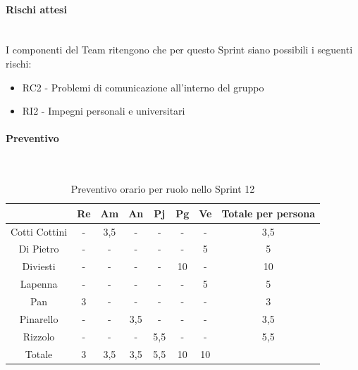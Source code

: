 \documentclass{article}
\begin{document}
                \paragraph{Rischi attesi}\mbox{}\\
                I componenti del Team ritengono che per questo Sprint siano possibili i seguenti rischi:
                \begin{itemize}
                    \item RC2 - Problemi di comunicazione all’interno del gruppo
                    \item RI2 - Impegni personali e universitari
                \end{itemize}

                \paragraph{Preventivo}\mbox{}\\
                \begin{table}[H]
                    \centering
                    \begin{tabular}{|c|c|c|c|c|c|c|c|}
                    \hline
                                  & Re  & Am  & An  & Pj  & Pg  & Ve  & Totale per persona \\ \hline
                    Cotti Cottini & -   & 3,5 & -   & -   & -   & -   & 3,5                \\ \hline
                    Di Pietro     & -   & -   & -   & -   & -   & 5   & 5                  \\ \hline
                    Diviesti      & -   & -   & -   & -   & 10  & -   & 10                 \\ \hline
                    Lapenna       & -   & -   & -   & -   & -   & 5   & 5                  \\ \hline
                    Pan           & 3   & -   & -   & -   & -   & -   & 3                  \\ \hline
                    Pinarello     & -   & -   & 3,5 & -   & -   & -   & 3,5                \\ \hline
                    Rizzolo       & -   & -   & -   & 5,5 & -   & -   & 5,5                \\ \hline
                    Totale        & 3   & 3,5 & 3,5 & 5,5 & 10  & 10  &                    \\ \hline
                    \end{tabular}
                    \caption{Preventivo orario per ruolo nello Sprint 12}
                \end{table}
\end{document}
